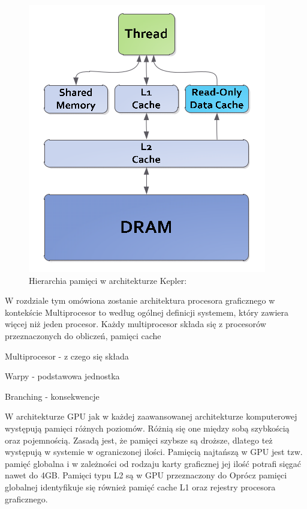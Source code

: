 \begin{figure}[ht]
\centering
\includegraphics[scale=0.4]{images/memory-hierarchy2.png}
\caption{Hierarchia pamięci w architekturze Kepler: \cite{kepler}}
\label{hierarchiaKepler}
\end{figure}


W rozdziale tym omówiona zostanie architektura procesora graficznego
w kontekście 
Multiprocesor to według ogólnej definicji systemem, który zawiera więcej niż
jeden procesor\cite{multi}. Każdy multiprocesor składa się z procesorów
przeznaczonych do obliczeń, pamięci cache

Multiprocesor - z czego się składa 

Warpy - podstawowa jednostka

Branching - konsekwencje

W architekturze GPU jak w każdej zaawansowanej architekturze komputerowej
występują pamięci różnych poziomów. Różnią się one między sobą szybkością oraz
pojemnością. Zasadą jest, że pamięci szybsze są droższe, dlatego też występują w systemie
w ograniczonej ilości. Pamięcią najtańszą w GPU jest tzw. pamięć globalna i w
zależności od rodzaju karty graficznej jej ilość potrafi sięgać nawet do 4GB.
Pamięci typu L2 są w GPU przeznaczony do 
Oprócz pamięci globalnej identyfikuje się również pamięć cache L1 oraz rejestry
procesora graficznego. 

